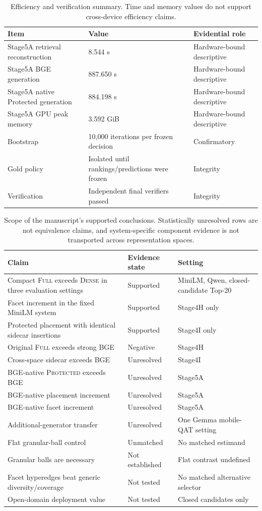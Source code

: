 \documentclass[11pt]{article}
\newcommand{\full}{\textsc{Full}\xspace}
\newcommand{\dense}{\textsc{Dense}\xspace}
\newcommand{\prot}{\textsc{Protected}\xspace}
\begin{document}
\begin{table}[h]
\centering
\small
\begin{tabular}{@{}lll@{}}
\toprule
Item & Value & Evidential role \\
\midrule
Stage5A retrieval reconstruction & 8.544 s & Hardware-bound descriptive \\
Stage5A BGE generation & 887.650 s & Hardware-bound descriptive \\
Stage5A native Protected generation & 884.198 s & Hardware-bound descriptive \\
Stage5A GPU peak memory & 3.592 GiB & Hardware-bound descriptive \\
Bootstrap & 10,000 iterations per frozen decision & Confirmatory \\
Gold policy & Isolated until rankings/predictions were frozen & Integrity \\
Verification & Independent final verifiers passed & Integrity \\
\bottomrule
\end{tabular}
\caption{Efficiency and verification summary. Time and memory values do not
support cross-device efficiency claims.}
\label{tab:efficiency}
\end{table}

\begin{table}[h]
\centering
\small
\begin{tabular}{@{}p{}p{}p{}@{}}
\toprule
Claim & Evidence state & Setting \\
\midrule
Compact \full exceeds \dense in three evaluation settings & Supported &
MiniLM, Qwen, closed-candidate Top-20 \\
Facet increment in the fixed MiniLM system & Supported & Stage4H only \\
Protected placement with identical sidecar insertions & Supported &
Stage4I only \\
Original \full exceeds strong BGE & Negative & Stage4H \\
Cross-space sidecar exceeds BGE & Unresolved & Stage4I \\
BGE-native \prot exceeds BGE & Unresolved & Stage5A \\
BGE-native placement increment & Unresolved & Stage5A \\
BGE-native facet increment & Unresolved & Stage5A \\
Additional-generator transfer & Unresolved & One Gemma mobile-QAT setting \\
Flat granular-ball control & Unmatched & No matched estimand \\
Granular balls are necessary & Not established & Flat contrast undefined \\
Facet hyperedges beat generic diversity/coverage & Not tested & No matched
alternative selector \\
Open-domain deployment value & Not tested & Closed candidates only \\
\bottomrule
\end{tabular}
\caption{Scope of the manuscript's supported conclusions. Statistically
unresolved rows are not equivalence claims, and system-specific component
evidence is not transported across representation spaces.}
\label{tab:claims}
\end{table}
\end{document}
